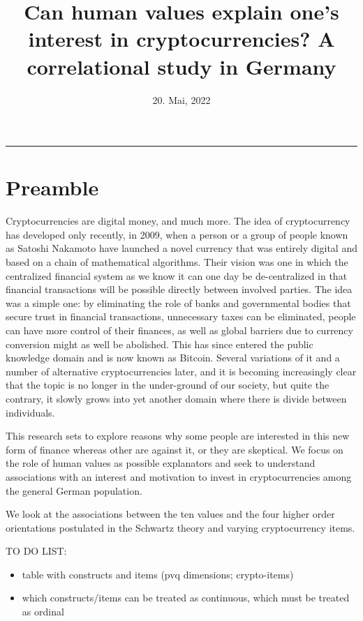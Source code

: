 \documentclass[doc]{apa7}
\title{Can human values explain one's interest in cryptocurrencies? A
correlational study in Germany}
\date{20. Mai, 2022}
\providecommand{\tightlist}{%
  \setlength{\itemsep}{0pt}\setlength{\parskip}{0pt}}
\begin{document}
\maketitle

\begin{center}\rule{0.5\linewidth}{0.5pt}\end{center}

\hypertarget{preamble}{%
\section{Preamble}\label{preamble}}

Cryptocurrencies are digital money, and much more. The idea of
cryptocurrency has developed only recently, in 2009, when a person or a
group of people known as Satoshi Nakamoto have launched a novel currency
that was entirely digital and based on a chain of mathematical
algorithms. Their vision was one in which the centralized financial
system as we know it can one day be de-centralized in that financial
transactions will be possible directly between involved parties. The
idea was a simple one: by eliminating the role of banks and governmental
bodies that secure trust in financial transactions, unnecessary taxes
can be eliminated, people can have more control of their finances, as
well as global barriers due to currency conversion might as well be
abolished. This has since entered the public knowledge domain and is now
known as Bitcoin. Several variations of it and a number of alternative
cryptocurrencies later, and it is becoming increasingly clear that the
topic is no longer in the under-ground of our society, but quite the
contrary, it slowly grows into yet another domain where there is divide
between individuals.

This research sets to explore reasons why some people are interested in
this new form of finance whereas other are against it, or they are
skeptical. We focus on the role of human values as possible explanators
and seek to understand associations with an interest and motivation to
invest in cryptocurrencies among the general German population.

We look at the associations between the ten values and the four higher
order orientations postulated in the Schwartz theory and varying
cryptocurrency items.

TO DO LIST:

\begin{itemize}
\tightlist
\item
  table with constructs and items (pvq dimensions; crypto-items)
\item
  which constructs/items can be treated as continuous, which must be
  treated as ordinal
\end{itemize}
\end{document}
